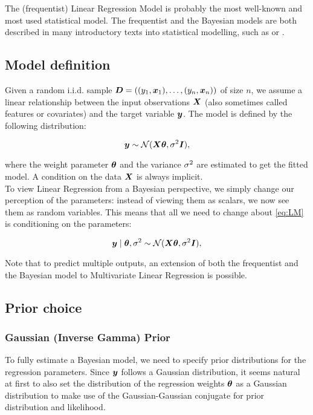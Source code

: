 
The (frequentist) Linear Regression Model is probably the most well-known and most used statistical model. The frequentist and the Bayesian models are both described in many introductory texts into statistical modelling, such as \citep{fahrmeir_regression_2021} or \citep{gelman_bayesian_2013}.

\subsection{Model definition}

Given a random i.i.d. sample $\bm{D} = ((y_1, \bm{x}_1), \dots, (y_n, \bm{x}_n))$ of size $n$, we assume a linear relationship between the input observations $\bm{X}$ (also sometimes called features or covariates) and the target variable $\bm{y}$. The model is defined by the following distribution: 

\begin{equation} \label{eq:LM}
    \bm{y} \sim \mathcal{N}(\bm{X} \bm{\theta}, \sigma^2 \bm{I}),
\end{equation}

where the weight parameter $\bm{\theta}$ and the variance $\sigma^2$ are estimated to get the fitted model.
A condition on the data $\bm{X}$ is always implicit. \\

To view Linear Regression from a Bayesian perspective, we simply change our perception of the parameters: instead of viewing them as scalars, we now see them as random variables.
This means that all we need to change about \eqref{eq:LM} is conditioning on the parameters:

\begin{equation} \label{eq:BLM}
    \bm{y} \mid \bm{\theta}, \sigma^2 \sim \mathcal{N}(\bm{X} \bm{\theta}, \sigma^2 \bm{I}), 
\end{equation}


Note that to predict multiple outputs, an extension of both the frequentist and the Bayesian model to Multivariate Linear Regression is possible.

\subsection{Prior choice}
\subsubsection*{Gaussian (Inverse Gamma) Prior}

To fully estimate a Bayesian model, we need to specify prior distributions for the regression parameters. 
Since $\bm{y}$ follows a Gaussian distribution, it seems natural at first to also set the distribution of the regression weights $\bm{\theta}$ as a Gaussian distribution to make use of the Gaussian-Gaussian conjugate for prior distribution and likelihood.

